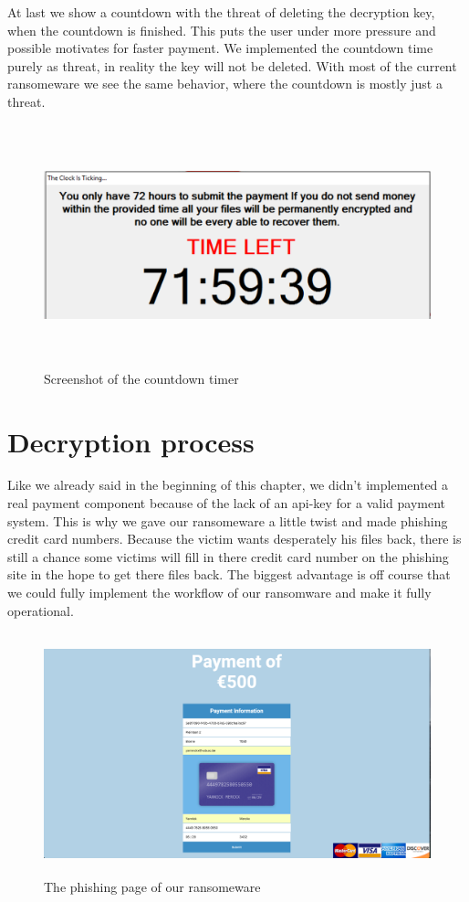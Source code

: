 At last we show a countdown with the threat of deleting the decryption key, when the countdown is finished. This puts the user under more pressure and possible motivates for faster payment.
We implemented the countdown time purely as threat, in reality the key will not be deleted. With most of the current ransomeware we see the same behavior, where the countdown is mostly just a threat.

\begin{figure}[H]
    \centering 
    \includegraphics[height=7cm]{countdown}
    \caption{Screenshot of the countdown timer}
    \label{instructions}
\end{figure}


\section{Decryption process}

Like we already said in the beginning of this chapter, we didn't implemented a real payment component because of the lack of an api-key for a valid payment system. This is why we gave our ransomeware a little twist and made phishing credit card numbers. Because the victim wants desperately his files back, there is still a chance some victims will fill in there credit card number on the phishing site in the hope to get there files back. The biggest advantage is off course that we could fully implement the workflow of our ransomware and make it fully operational.

\begin{figure}[H]
    \centering 
    \includegraphics[height=7cm]{payment}
    \caption{The phishing page of our ransomeware}
    \label{instructions}
\end{figure}



